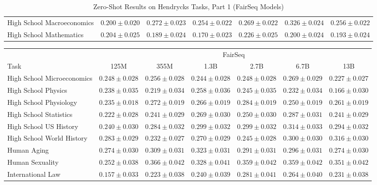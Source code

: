 \documentclass[11pt]{article}
\begin{document}
{\begin{landscape}
\begin{table}
\begin{tabular}{l c c c c c c }
High School Macroeconomics & $0.200 \pm 0.020$ & $0.272 \pm 0.023$ & $0.254 \pm 0.022$ & $0.269 \pm 0.022$ & $0.326 \pm 0.024$ & $0.256 \pm 0.022$ \\ 
High School Mathematics & $0.204 \pm 0.025$ & $0.189 \pm 0.024$ & $0.170 \pm 0.023$ & $0.226 \pm 0.025$ & $0.200 \pm 0.024$ & $0.193 \pm 0.024$ \\ 
\bottomrule
\end{tabular}
\caption{Zero-Shot Results on Hendrycks Tasks, Part 1 (FairSeq Models)}
\label{tab:hendrycks-fair1}
\end{table}

\begin{table}    
\centering 
\begin{tabular}{l c c c c c c }
 & \multicolumn{6}{c}{FairSeq} \\
Task & 125M & 355M & 1.3B & 2.7B & 6.7B & 13B\\ \toprule
High School Microeconomics & $0.248 \pm 0.028$ & $0.256 \pm 0.028$ & $0.244 \pm 0.028$ & $0.248 \pm 0.028$ & $0.269 \pm 0.029$ & $0.227 \pm 0.027$ \\ 
High School Physics & $0.238 \pm 0.035$ & $0.219 \pm 0.034$ & $0.258 \pm 0.036$ & $0.245 \pm 0.035$ & $0.232 \pm 0.034$ & $0.166 \pm 0.030$ \\ 
High School Physiology & $0.235 \pm 0.018$ & $0.272 \pm 0.019$ & $0.266 \pm 0.019$ & $0.284 \pm 0.019$ & $0.250 \pm 0.019$ & $0.261 \pm 0.019$ \\ 
High School Statistics & $0.222 \pm 0.028$ & $0.241 \pm 0.029$ & $0.269 \pm 0.030$ & $0.250 \pm 0.030$ & $0.287 \pm 0.031$ & $0.241 \pm 0.029$ \\ 
High School US History & $0.240 \pm 0.030$ & $0.284 \pm 0.032$ & $0.299 \pm 0.032$ & $0.299 \pm 0.032$ & $0.314 \pm 0.033$ & $0.294 \pm 0.032$ \\ 
High School World History & $0.283 \pm 0.029$ & $0.232 \pm 0.027$ & $0.270 \pm 0.029$ & $0.245 \pm 0.028$ & $0.300 \pm 0.030$ & $0.316 \pm 0.030$ \\ 
Human Aging & $0.274 \pm 0.030$ & $0.309 \pm 0.031$ & $0.323 \pm 0.031$ & $0.291 \pm 0.031$ & $0.296 \pm 0.031$ & $0.274 \pm 0.030$ \\ 
Human Sexuality & $0.252 \pm 0.038$ & $0.366 \pm 0.042$ & $0.328 \pm 0.041$ & $0.359 \pm 0.042$ & $0.359 \pm 0.042$ & $0.351 \pm 0.042$ \\
International Law & $0.157 \pm 0.033$ & $0.223 \pm 0.038$ & $0.240 \pm 0.039$ & $0.281 \pm 0.041$ & $0.264 \pm 0.040$ & $0.231 \pm 0.038$ \\

\end{tabular}
\end{table}
\end{landscape}}
\end{document}
